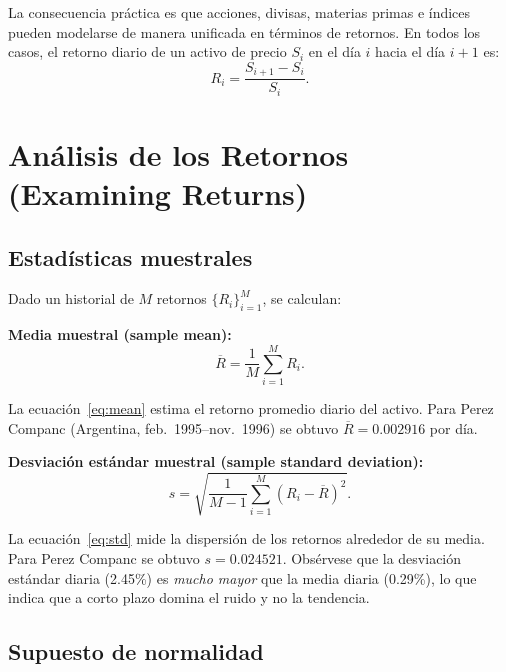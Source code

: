 \documentclass[12pt]{article}
\begin{document}
La consecuencia pr\'actica es que acciones, divisas, materias primas e \'indices
pueden modelarse de manera unificada en t\'erminos de retornos.
En todos los casos, el retorno diario de un activo de precio $S_i$ en el d\'ia $i$
hacia el d\'ia $i+1$ es:
\[
  R_i = \frac{S_{i+1} - S_i}{S_i}.
\]

\section{An\'alisis de los Retornos (Examining Returns)}

\subsection{Estad\'isticas muestrales}

Dado un historial de $M$ retornos $\{R_i\}_{i=1}^M$, se calculan:

\textbf{Media muestral (sample mean):}
\begin{equation}
  \overline{R} = \frac{1}{M}\sum_{i=1}^{M} R_i.
  \label{eq:mean}
\end{equation}

\begin{intuicionmat}
La ecuaci\'on~\eqref{eq:mean} estima el retorno promedio diario del activo.
Para Perez Companc (Argentina, feb.~1995--nov.~1996) se obtuvo
$\overline{R} = 0.002916$ por d\'ia.
\end{intuicionmat}

\textbf{Desviaci\'on est\'andar muestral (sample standard deviation):}
\begin{equation}
  s = \sqrt{\frac{1}{M-1}\sum_{i=1}^{M}(R_i - \overline{R})^2}.
  \label{eq:std}
\end{equation}

\begin{intuicionmat}
La ecuaci\'on~\eqref{eq:std} mide la dispersi\'on de los retornos alrededor de su
media. Para Perez Companc se obtuvo $s = 0.024521$. Obs\'ervese que la desviaci\'on
est\'andar diaria (2.45\%) es \emph{mucho mayor} que la media diaria (0.29\%),
lo que indica que a corto plazo domina el ruido y no la tendencia.
\end{intuicionmat}

\subsection{Supuesto de normalidad}
\end{document}
